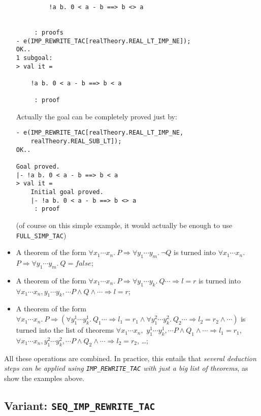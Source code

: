 \documentclass{llncs}
\newcommand*\IMPREWRITETAC{\texttt{IMP\_REWRITE\_TAC}\xspace}
\newcommand*\SEQIMPREWRITETAC{\texttt{SEQ\_IMP\_REWRITE\_TAC}\xspace}
\newcommand*\SIMPTAC{\texttt{FULL\_SIMP\_TAC}\xspace}
\begin{document}
\begin{itemize}
\begin{example}
\begin{verbatim}
         !a b. 0 < a - b ==> b <> a
    
    
     : proofs
- e(IMP_REWRITE_TAC[realTheory.REAL_LT_IMP_NE]);
OK..
1 subgoal:
> val it =
    
    !a b. 0 < a - b ==> b < a
    
     : proof \end{verbatim}
        Actually the goal can be completely proved just by:
        \begin{verbatim}
- e(IMP_REWRITE_TAC[realTheory.REAL_LT_IMP_NE,
    realTheory.REAL_SUB_LT]);
OK..

Goal proved.
|- !a b. 0 < a - b ==> b < a
> val it =
    Initial goal proved.
    |- !a b. 0 < a - b ==> b <> a
     : proof \end{verbatim}
        (of course on this simple example, it would actually be enough to use\\\SIMPTAC)
      \end{example}

			\item A theorem of the form $\forall x_1\cdots x_n.\ P \Rightarrow \forall y_1\cdots y_m.\ \neg Q$
				is turned into $\forall x_1\cdots x_n.$ $P \Rightarrow \forall y_1\cdots y_m.\ Q=false$;

      \item A theorem of the form 
        $\forall x_1\cdots x_n.\ P \Rightarrow \forall y_1\cdots y_k.\ Q \cdots \Rightarrow l=r$
        is turned into $\forall x_1\cdots x_n,y_1\cdots y_k,\cdots P \wedge Q \wedge \cdots \Rightarrow l=r$;

      \item A theorem of the form
        $\forall x_1\cdots x_n.\ P \Rightarrow
        (\forall y^1_1\cdots y^1_k.\ Q_1 \cdots \Rightarrow l_1=r_1
        \wedge \forall y^2_1\cdots y^2_k.\ Q_2 \cdots \Rightarrow l_2=r_2
        \wedge \cdots)$ 
        is turned into the list of theorems
        $\forall x_1\cdots x_n,$
        $y^1_1\cdots y^1_k,\cdots P \wedge Q_1 \wedge \cdots \Rightarrow l_1=r_1$,
        $\forall x_1\cdots x_n,y^2_1\cdots y^2_k,\cdots P \wedge Q_2 \wedge \cdots \Rightarrow l_2=r_2$,
        \ldots;
		\end{itemize}
    All these operations are combined. In practice, this entails that \emph{several deduction steps can be
    applied using \IMPREWRITETAC with just a big list of theorems}, as show the examples above.

    \subsection{Variant: \SEQIMPREWRITETAC}
\end{document}
